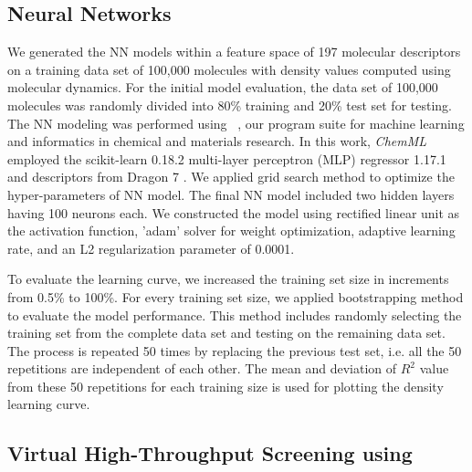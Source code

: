 \subsection{Neural Networks}
\label{subsec:nn}

We generated the NN models within a feature space of 197 molecular descriptors on a training data set of 100,000 molecules with density values computed using molecular dynamics. For the initial model evaluation, the data set of 100,000 molecules was randomly divided into 80\% training and 20\% test set for testing. 
The NN modeling was performed using \chemml\ \cite{Haghighatlari2017}, our program suite for machine learning and informatics in chemical and materials research. In this work, \textit{ChemML} employed the scikit-learn 0.18.2 multi-layer perceptron (MLP) regressor 1.17.1 \cite{scikit-learn} and descriptors from Dragon 7 \cite{Taletesrl2011}. We applied grid search method to optimize the hyper-parameters of NN model.
The final NN model included two hidden layers having 100 neurons each. 	We constructed the model using rectified linear unit as the activation function, 'adam' solver for weight optimization, adaptive learning rate, and an L2 regularization parameter of 0.0001. 

To evaluate the learning curve, we increased the training set size in increments from 0.5\% to 100\%. For every training set size, we applied bootstrapping method to evaluate the model performance. This method includes randomly selecting the training set from the complete data set and testing on the remaining data set. The process is repeated 50 times by replacing the previous test set, i.e. all the 50 repetitions are independent of each other. The mean and deviation of $R^2$ value from these 50 repetitions for each training size is used for plotting the density learning curve. 

\subsection{Virtual High-Throughput Screening using \chemhtps}
\label{chemhtps}

